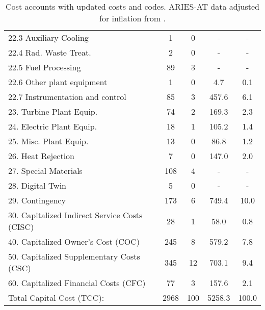 \begin{table}[h!]
{\begin{tabular}{lcccc}
\hspace{10mm}22.3 Auxiliary Cooling & 1 & 0 & - & - \\
\hspace{10mm}22.4 Rad. Waste Treat. & 2 & 0 & - & - \\
\hspace{10mm}22.5 Fuel Processing & 89 & 3 & - & - \\
\hspace{10mm}22.6 Other plant equipment & 1 & 0 & 4.7 & 0.1 \\
\hspace{10mm}22.7 Instrumentation and control & 85 & 3 & 457.6 & 6.1 \\
\hspace{5mm}23. Turbine Plant Equip. & 74 & 2 & 169.3 & 2.3 \\
\hspace{5mm}24. Electric Plant Equip. & 18 & 1 & 105.2 & 1.4 \\
\hspace{5mm}25. Misc. Plant Equip. & 13 & 0 & 86.8 & 1.2 \\
\hspace{5mm}26. Heat Rejection & 7 & 0 & 147.0 & 2.0 \\
\hspace{5mm}27. Special Materials & 108 & 4 & - & - \\
\hspace{5mm}28. Digital Twin & 5 & 0 & - & - \\
\hspace{5mm}29. Contingency & 173 & 6 & 749.4 & 10.0 \\
30. Capitalized Indirect Service Costs (CISC) & 28 & 1 & 58.0 & 0.8 \\
40. Capitalized Owner’s Cost (COC) & 245 & 8 & 579.2 & 7.8 \\
50. Capitalized Supplementary Costs (CSC) & 345 & 12 & 703.1 & 9.4 \\
60. Capitalized Financial Costs (CFC) & 77 & 3 & 157.6 & 2.1 \\
\hline
Total Capital Cost (TCC): & 2968 & 100 & 5258.3 & 100.0 \\
\hline
\end{tabular}
}
\caption{Cost accounts with updated costs and codes. ARIES-AT data adjusted for inflation from \cite{gordon1986mirror}.}
\label{tab:costs_updated_codes}
\end{table}


